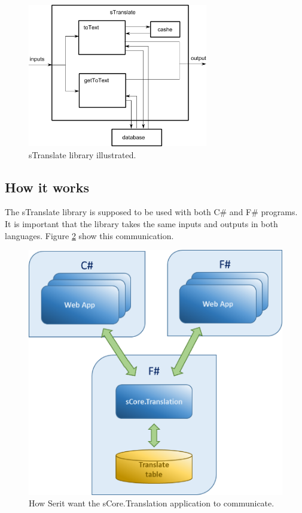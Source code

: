 \documentclass[12pt, a4paper]{article}
\begin{document}
\begin{figure}[!h]
    \includegraphics[width=0.7\textwidth]{sTranslateWorkings}
    \centering
    \caption{sTranslate library illustrated.}
    \label{fig:sTranslateWorkings}
\end{figure}

\newpage
\subsection{How it works}
The sTranslate library is supposed to be used with both C\# and F\# programs. It is important that the library takes the same inputs and outputs in both languages. Figure \ref{fig:sTranslate_communication} show this communication.

\begin{figure}[!h]
    \includegraphics[scale=0.5]{image02}
    \centering
    \caption{How Serit want the sCore.Translation application to communicate.}
    \label{fig:sTranslate_communication}
\end{figure}
\end{document}

